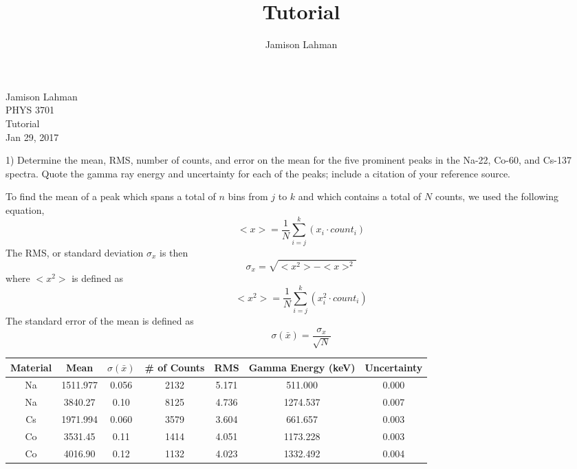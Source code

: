 \documentclass[10pt]{article}
\author{Jamison Lahman}
\title{Tutorial}
\begin{document}
\begin{flushright}Jamison Lahman \\
PHYS 3701 \\
Tutorial \\
Jan 29, 2017
\end{flushright}

\begin{flushleft}
1) Determine the mean, RMS, number of counts, and error on the mean for the five prominent peaks in the Na-22, Co-60, and Cs-137 spectra. Quote the gamma ray energy and uncertainty for each of the peaks; include a citation of your reference source.
\end{flushleft}
To find the mean of a peak which spans a total of $n$ bins from $j$ to $k$ and which contains a total of $N$ counts, we used the following equation,
\begin{equation}
<x>  = \frac{1}{N}\sum^{k}_{i=j} (x_i \cdot count_i)
\end{equation}
The RMS, or standard deviation $\sigma_x$ is then
\begin{equation}
\sigma_{x} = \sqrt{<x^2>-<x>^2}
\end{equation}
where $<x^2>$ is defined as
\begin{equation}
<x^2>  = \frac{1}{N}\sum^{k}_{i=j} (x_{i}^{2} \cdot count_i)
\end{equation}
The standard error of the mean is defined as
\begin{equation}
\sigma(\bar{x}) = \frac{\sigma_x}{\sqrt{N}}
\end{equation}
\begin{center}
\begin{tabular}{|c|c|c|c|c|c|c|}
\hline 
Material & Mean & $\sigma(\bar{x})$ & \# of Counts & RMS & Gamma Energy (keV) & Uncertainty \\ 
\hline 
Na & 1511.977 & 0.056 & 2132 & 5.171 & 511.000 & 0.000 \\ 
\hline 
Na & 3840.27 & 0.10 & 8125 & 4.736 & 1274.537 & 0.007 \\ 
\hline 
Cs & 1971.994 & 0.060 & 3579 & 3.604 & 661.657 & 0.003 \\ 
\hline 
Co & 3531.45 & 0.11 & 1414 & 4.051 & 1173.228 & 0.003 \\ 
\hline 
Co & 4016.90 & 0.12 & 1132 & 4.023 & 1332.492 & 0.004 \\ 
\hline 
\end{tabular}
\end{center}
\end{document}
